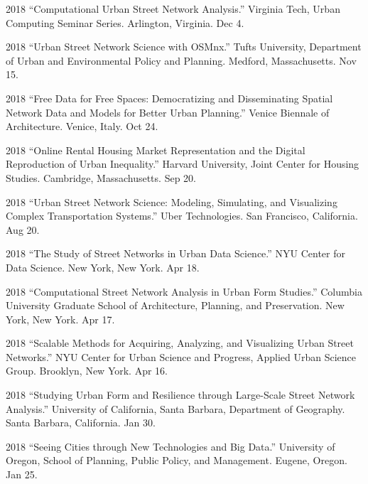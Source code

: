 \documentclass[12pt,letterpaper]{report}
\begin{document}
	\begin{tablist}
		
		\item[2018] \tab \enquote{Computational Urban Street Network Analysis.} Virginia Tech, Urban Computing Seminar Series. Arlington, Virginia. Dec 4.
		
		\item[2018] \tab \enquote{Urban Street Network Science with OSMnx.} Tufts University, Department of Urban and Environmental Policy and Planning. Medford, Massachusetts. Nov 15.
		
		\item[2018] \tab \enquote{Free Data for Free Spaces: Democratizing and Disseminating Spatial Network Data and Models for Better Urban Planning.} Venice Biennale of Architecture. Venice, Italy. Oct 24.
		
		\item[2018] \tab \enquote{Online Rental Housing Market Representation and the Digital Reproduction of Urban Inequality.} Harvard University, Joint Center for Housing Studies. Cambridge, Massachusetts. Sep 20.
		
		\item[2018] \tab \enquote{Urban Street Network Science: Modeling, Simulating, and Visualizing Complex Transportation Systems.} Uber Technologies. San Francisco, California. Aug 20.
		
		\item[2018] \tab \enquote{The Study of Street Networks in Urban Data Science.} NYU Center for Data Science. New York, New York. Apr 18.
		
		\item[2018] \tab \enquote{Computational Street Network Analysis in Urban Form Studies.} Columbia University Graduate School of Architecture, Planning, and Preservation. New York, New York. Apr 17.
		
		\item[2018] \tab \enquote{Scalable Methods for Acquiring, Analyzing, and Visualizing Urban Street Networks.} NYU Center for Urban Science and Progress, Applied Urban Science Group. Brooklyn, New York. Apr 16.
		
		\item[2018] \tab \enquote{Studying Urban Form and Resilience through Large-Scale Street Network Analysis.} University of California, Santa Barbara, Department of Geography. Santa Barbara, California. Jan 30.
		
		\item[2018] \tab \enquote{Seeing Cities through New Technologies and Big Data.} University of Oregon, School of Planning, Public Policy, and Management. Eugene, Oregon. Jan 25.
		

\end{tablist}
\end{document}
